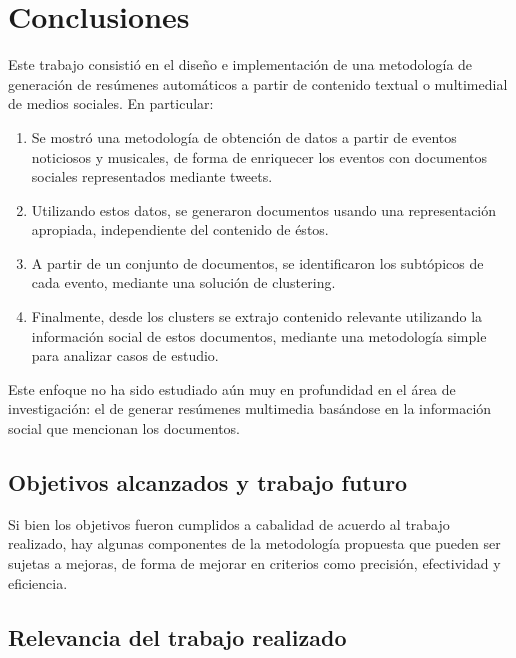 
\chapter{Conclusiones}
\label{sec-5}

\label{cap:conclusiones}

Este trabajo consistió en el diseño e implementación de una
metodología de generación de resúmenes automáticos a partir de
contenido textual o multimedial de medios sociales. En particular:

\begin{enumerate}
\item Se mostró una metodología de obtención de datos a partir de eventos
   noticiosos y musicales, de forma de enriquecer los eventos con
   documentos sociales representados mediante tweets.
\item Utilizando estos datos, se generaron documentos usando una
   representación apropiada, independiente del contenido de éstos.
\item A partir de un conjunto de documentos, se identificaron los
   subtópicos de cada evento, mediante una solución de clustering.
\item Finalmente, desde los clusters se extrajo contenido relevante
   utilizando la información social de estos documentos, mediante una
   metodología simple para analizar casos de estudio.
\end{enumerate}
Este enfoque no ha sido estudiado aún muy en profundidad en el área de
investigación: el de generar resúmenes multimedia basándose en la
información social que mencionan los documentos.

\section{Objetivos alcanzados y trabajo futuro}
\label{sec-5.1}


Si bien los objetivos fueron cumplidos a cabalidad de acuerdo al
trabajo realizado, hay algunas componentes de la metodología propuesta
que pueden ser sujetas a mejoras, de forma de mejorar en criterios
como precisión, efectividad y eficiencia.

\section{Relevancia del trabajo realizado}
\label{sec-5.2}

